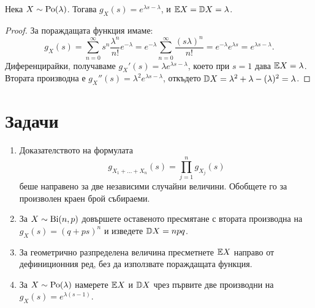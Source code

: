 \begin{prop}
Нека $X \sim \operatorname{Po}(\lambda)$. Тогава $g_X(s) = e^{\lambda s - \lambda}$, и $\mathbb{E} X = \mathbb{D} X = \lambda$.
\end{prop}

\begin{proof}
За пораждащата функция имаме:
\[ g_X(s) = \sum_{n=0}^{\infty} s^n \frac{\lambda^n}{n!} e^{-\lambda} = e^{-\lambda} \sum_{n=0}^{\infty} \frac{(s\lambda)^n}{n!} = e^{-\lambda} e^{\lambda s} = e^{\lambda s - \lambda}. \]
Диференцирайки, получаваме $g_X'(s) = \lambda e^{\lambda s - \lambda}$, което при $s=1$ дава $\mathbb{E} X = \lambda$.
Втората производна е $g_X''(s) = \lambda^2 e^{\lambda s - \lambda}$, откъдето $\mathbb{D} X = \lambda^2 + \lambda - (\lambda)^2 = \lambda$.
\end{proof}

\section{Задачи}

\begin{enumerate}
    \item Доказателството на формулата
    \[
    g_{X_1+\dots+X_n}(s)=\prod_{j=1}^n g_{X_j}(s)
    \]
    беше направено за две независими случайни величини. Обобщете го за произволен краен брой събираеми.
    \item За $X\sim\operatorname{Bi}(n,p)$ довършете оставеното пресмятане с втората производна на $g_X(s)=(q+ps)^n$ и изведете $\mathbb{D} X=npq$.
    \item За геометрично разпределена величина пресметнете $\mathbb{E} X$ направо от дефиниционния ред, без да използвате пораждащата функция.
    \item За $X\sim\operatorname{Po}(\lambda)$ намерете $\mathbb{E} X$ и $\mathbb{D} X$ чрез първите две производни на $g_X(s)=e^{\lambda(s-1)}$.
\end{enumerate}
